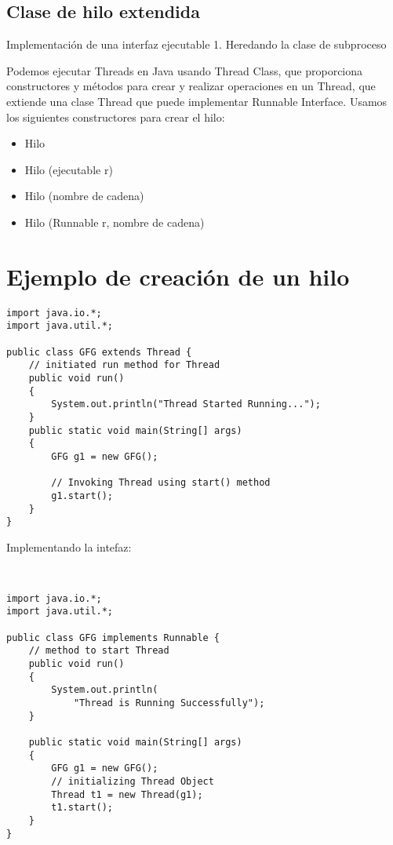 \documentclass{article}
\begin{document}
\subsection{Clase de hilo extendida}

Implementación de una interfaz ejecutable
1. Heredando la clase de subproceso

Podemos ejecutar Threads en Java usando Thread Class, que proporciona constructores y métodos para crear y realizar operaciones en un Thread, que extiende una clase Thread que puede implementar Runnable Interface. Usamos los siguientes constructores para crear el hilo:

\begin{itemize}
\item Hilo
\item Hilo (ejecutable r)
\item Hilo (nombre de cadena)
\item Hilo (Runnable r, nombre de cadena)
\end{itemize}

\section{Ejemplo de creación de un hilo}
\begin{verbatim}
import java.io.*;
import java.util.*;

public class GFG extends Thread {
    // initiated run method for Thread
    public void run()
    {
        System.out.println("Thread Started Running...");
    }
    public static void main(String[] args)
    {
        GFG g1 = new GFG();

        // Invoking Thread using start() method
        g1.start();
    }
}
\end{verbatim}

Implementando la intefaz:

\begin{verbatim}


import java.io.*;
import java.util.*;

public class GFG implements Runnable {
    // method to start Thread
    public void run()
    {
        System.out.println(
            "Thread is Running Successfully");
    }

    public static void main(String[] args)
    {
        GFG g1 = new GFG();
        // initializing Thread Object
        Thread t1 = new Thread(g1);
        t1.start();
    }
}
\end{verbatim}
\end{document}
